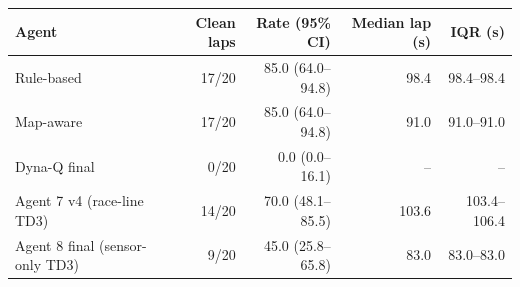 \begin{tabular}{lrrrr}
\toprule
Agent & Clean laps & Rate (95\% CI) & Median lap (s) & IQR (s) \\
\midrule
Rule-based & 17/20 & 85.0 (64.0--94.8) & 98.4 & 98.4--98.4 \\
Map-aware & 17/20 & 85.0 (64.0--94.8) & 91.0 & 91.0--91.0 \\
Dyna-Q final & 0/20 & 0.0 (0.0--16.1) & -- & -- \\
Agent 7 v4 (race-line TD3) & 14/20 & 70.0 (48.1--85.5) & 103.6 & 103.4--106.4 \\
Agent 8 final (sensor-only TD3) & 9/20 & 45.0 (25.8--65.8) & 83.0 & 83.0--83.0 \\
\bottomrule
\end{tabular}
